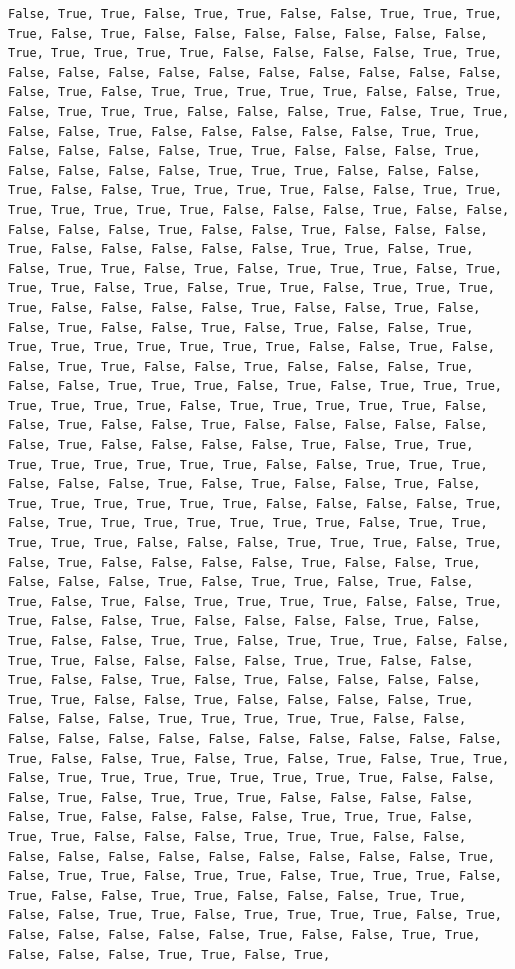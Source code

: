 \documentclass[
  letterpaper,
  DIV=11,
  numbers=noendperiod]{scrartcl}
\begin{document}
\begin{verbatim}
False, True, True, False, True, True, False, False, True, True, True, True, False, True, False, False, False, False, False, False, False, True, True, True, True, True, False, False, False, False, True, True, False, False, False, False, False, False, False, False, False, False, False, True, False, True, True, True, True, True, False, False, True, False, True, True, True, False, False, False, True, False, True, True, False, False, True, False, False, False, False, False, True, True, False, False, False, False, True, True, False, False, False, True, False, False, False, False, True, True, True, False, False, False, True, False, False, True, True, True, True, False, False, True, True, True, True, True, True, True, False, False, False, True, False, False, False, False, False, True, False, False, True, False, False, False, True, False, False, False, False, False, True, True, False, True, False, True, True, False, True, False, True, True, True, False, True, True, True, False, True, False, True, True, False, True, True, True, True, False, False, False, False, True, False, False, True, False, False, True, False, False, True, False, True, False, False, True, True, True, True, True, True, True, True, False, False, True, False, False, True, True, False, False, True, False, False, False, True, False, False, True, True, True, False, True, False, True, True, True, True, True, True, True, False, True, True, True, True, True, False, False, True, False, False, True, False, False, False, False, False, False, True, False, False, False, False, True, False, True, True, True, True, True, True, True, True, False, False, True, True, True, False, False, False, True, False, True, False, False, True, False, True, True, True, True, True, True, False, False, False, False, True, False, True, True, True, True, True, True, True, False, True, True, True, True, True, False, False, False, True, True, True, False, True, False, True, False, False, False, False, True, False, False, True, False, False, False, True, False, True, True, False, True, False, True, False, True, False, True, True, True, True, False, False, True, True, False, False, True, False, False, False, False, True, False, True, False, False, True, True, False, True, True, True, False, False, True, True, False, False, False, False, True, True, False, False, True, False, False, True, False, True, False, False, False, False, True, True, False, False, True, False, False, False, False, True, False, False, False, True, True, True, True, True, False, False, False, False, False, False, False, False, False, False, False, False, True, False, False, True, False, True, False, True, False, True, True, False, True, True, True, True, True, True, True, True, False, False, False, True, False, True, True, True, False, False, False, False, False, True, False, False, False, False, True, True, True, False, True, True, False, False, False, True, True, True, False, False, False, False, False, False, False, False, False, False, False, True, False, True, True, False, True, True, False, True, True, True, False, True, False, False, True, True, False, False, False, True, True, False, False, True, True, False, True, True, True, True, False, True, False, False, False, False, False, True, False, False, True, True, False, False, False, True, True, False, True, 
\end{verbatim}
\end{document}
